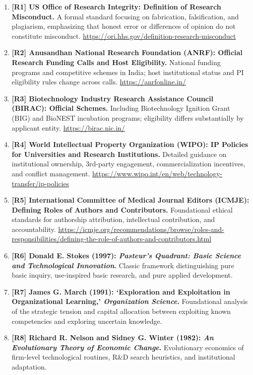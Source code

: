 \begin{enumerate}
    \item \textbf{[R1] US Office of Research Integrity: Definition of Research Misconduct.} A formal standard focusing on fabrication, falsification, and plagiarism, emphasizing that honest error or differences of opinion do not constitute misconduct. \url{https://ori.hhs.gov/definition-research-misconduct}
    \item \textbf{[R2] Anusandhan National Research Foundation (ANRF): Official Research Funding Calls and Host Eligibility.} National funding programs and competitive schemes in India; host institutional status and PI eligibility rules change across calls. \url{https://anrfonline.in/}
    \item \textbf{[R3] Biotechnology Industry Research Assistance Council (BIRAC): Official Schemes.} Including Biotechnology Ignition Grant (BIG) and BioNEST incubation programs; eligibility differs substantially by applicant entity. \url{https://birac.nic.in/}
    \item \textbf{[R4] World Intellectual Property Organization (WIPO): IP Policies for Universities and Research Institutions.} Detailed guidance on institutional ownership, 3rd-party engagement, commercialization incentives, and conflict management. \url{https://www.wipo.int/en/web/technology-transfer/ip-policies}
    \item \textbf{[R5] International Committee of Medical Journal Editors (ICMJE): Defining Roles of Authors and Contributors.} Foundational ethical standards for authorship attribution, intellectual contribution, and accountability. \url{https://icmje.org/recommendations/browse/roles-and-responsibilities/defining-the-role-of-authors-and-contributors.html}
    \item \textbf{[R6] Donald E. Stokes (1997): \textit{Pasteur's Quadrant: Basic Science and Technological Innovation}.} Classic framework distinguishing pure basic inquiry, use-inspired basic research, and pure applied development.
    \item \textbf{[R7] James G. March (1991): `Exploration and Exploitation in Organizational Learning,' \textit{Organization Science}.} Foundational analysis of the strategic tension and capital allocation between exploiting known competencies and exploring uncertain knowledge.
    \item \textbf{[R8] Richard R. Nelson and Sidney G. Winter (1982): \textit{An Evolutionary Theory of Economic Change}.} Evolutionary economics of firm-level technological routines, R\&D search heuristics, and institutional adaptation.

\end{enumerate}
